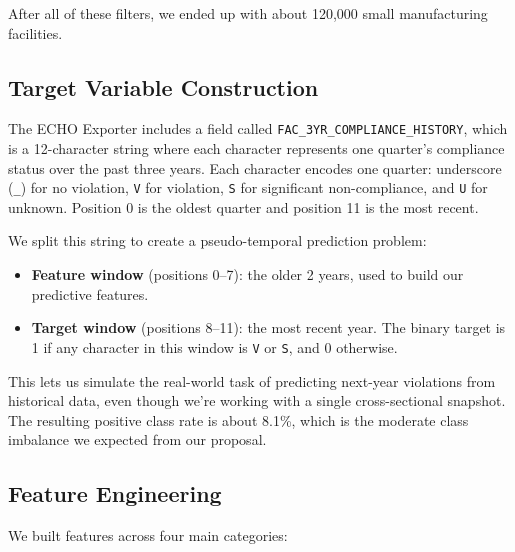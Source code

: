 \documentclass[11pt]{article}
\begin{document}
After all of these filters, we ended up with about 120,000 small manufacturing facilities.

\subsection{Target Variable Construction}

The ECHO Exporter includes a field called \texttt{FAC\_3YR\_COMPLIANCE\_HISTORY}, which is a 12-character string where each character represents one quarter's compliance status over the past three years. Each character encodes one quarter: underscore (\texttt{\_}) for no violation, \texttt{V} for violation, \texttt{S} for significant non-compliance, and \texttt{U} for unknown. Position 0 is the oldest quarter and position 11 is the most recent.

We split this string to create a pseudo-temporal prediction problem:
\begin{itemize}
    \item \textbf{Feature window} (positions 0--7): the older 2 years, used to build our predictive features.
    \item \textbf{Target window} (positions 8--11): the most recent year. The binary target is 1 if any character in this window is \texttt{V} or \texttt{S}, and 0 otherwise.
\end{itemize}

This lets us simulate the real-world task of predicting next-year violations from historical data, even though we're working with a single cross-sectional snapshot. The resulting positive class rate is about 8.1\%, which is the moderate class imbalance we expected from our proposal.

\subsection{Feature Engineering}

We built features across four main categories:
\end{document}
